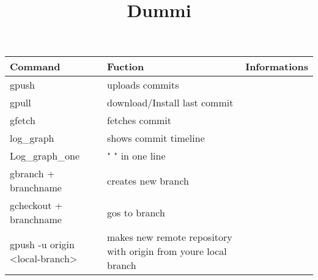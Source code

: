 \documentclass[12pt]{article}
\title{Dummi}
\begin{document}
\setlength{\parindent}{0pt}
\setlength{\parskip}{30pt}
\setlength{\baselineskip}{20pt}




\centering
\begin{tabular}{| p{6.5cm} | p{6.5cm} | p{6.5cm} |}
    \hline
    Command & Fuction & Informations \\

    \hline
    gpush & uploads commits & \\
    \hline 
    gpull & download/Install last commit & \\
    \hline
    gfetch & fetches commit & \\
    \hline 
    log\_graph & shows commit timeline & \\
    \hline 
    Log\_graph\_one & "   " in one line & \\
    \hline
    gbranch + branchname & creates new branch & \\
    \hline
    gcheckout + branchname & gos to branch & \\
    \hline
    gpush -u origin <local-branch> & makes new remote repository with origin from youre local branch \\
    \hline


\end{tabular}
\end{document}
